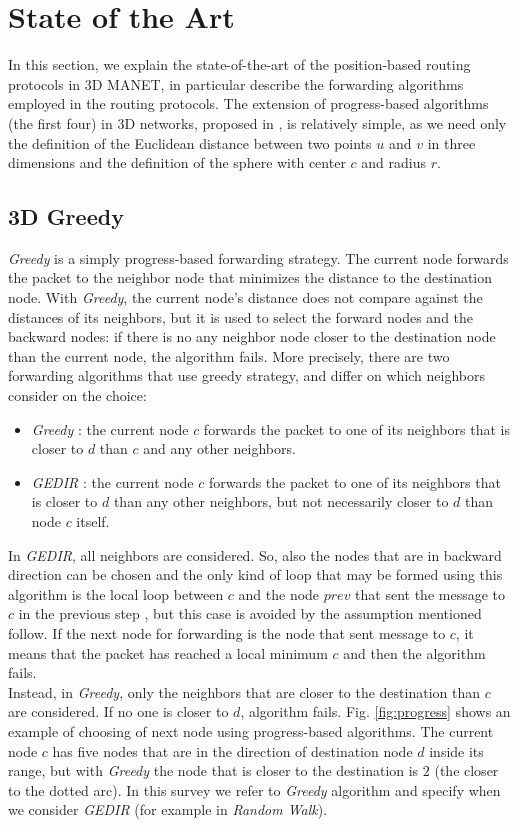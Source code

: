 \documentclass[journal,comsoc]{IEEEtran}
\begin{document}
\section{State of the Art}
In this section, we explain the state-of-the-art of the position-based routing protocols in 3D MANET, in particular describe the forwarding algorithms employed in the routing protocols. The extension of progress-based algorithms (the first four) in 3D networks, proposed in \cite{kao:3d}, is relatively simple, as we need only the definition of the Euclidean distance between two points \(u\) and \(v\) in three dimensions and the definition of the sphere with center \(c\) and radius \(r\).

\subsection{3D Greedy}
\emph{Greedy} is a simply progress-based forwarding strategy. The current node forwards the packet to the neighbor node that minimizes the distance to the destination node. With \emph{Greedy}, the current node's distance does not compare against the distances of its neighbors, but it is used to select the forward nodes and the backward nodes: if there is no any neighbor node closer to the destination node than the current node, the algorithm fails. More precisely, there are two forwarding algorithms that use greedy strategy, and differ
on which neighbors consider on the choice:
\begin{itemize}
\item \emph{Greedy} \cite{finn:greedy}: the current node \(c\) forwards the packet to one of its neighbors that is closer to \(d\) than \(c\) and any other neighbors.
\item \emph{GEDIR} \cite{lin:loop}: the current node \(c\) forwards the packet to one of its neighbors that is closer to \(d\) than any other neighbors, but not necessarily closer to \(d\) than node \(c\) itself.
\end{itemize}

In \emph{GEDIR}, all neighbors are considered. So, also the nodes that are in backward direction can be chosen and the only kind of loop that may be formed using this algorithm is the local loop between \(c\) and the node \(prev\) that sent the message to \(c\) in the previous step \cite{lin:loop}, but this case is avoided by the assumption mentioned follow.
If the next node for forwarding is the node that sent message to \(c\), it means that the packet has reached a local minimum \(c\) and then the algorithm fails.\\
Instead, in \emph{Greedy}, only the neighbors that are closer to the destination than \(c\) are considered. If no one is closer to \(d\), algorithm fails. Fig. \ref{fig:progress} shows an example of choosing of next node using progress-based algorithms. The current node \(c\) has five nodes that are in the direction of destination node \(d\) inside its range, but with \emph{Greedy} the node that is closer to the destination is \(2\) (the closer to the dotted arc). In this survey we refer to \emph{Greedy} algorithm and specify when we consider \emph{GEDIR} (for example in \emph{Random Walk}).
\end{document}
